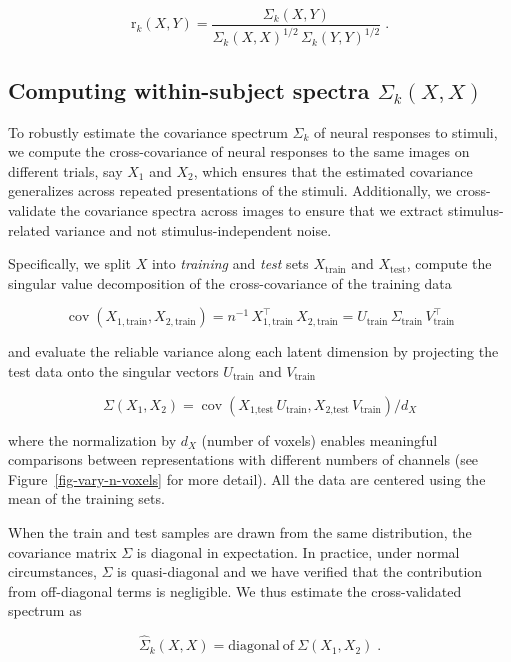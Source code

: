 \documentclass[10pt]{article}
\begin{document}
\[
\mathrm{r}_k(X, Y) =  \frac{\Sigma_k(X, Y)}{\Sigma_k(X, X)^{1/2}\, \Sigma_k(Y, Y)^{1/2}}\;.
\]

\subsection{\texorpdfstring{Computing within-subject spectra
\(\Sigma_k(X, X)\)}{Computing within-subject spectra \textbackslash Sigma\_k(X, X)}}\label{computing-within-subject-spectra-sigma_kx-x}

To robustly estimate the covariance spectrum \(\Sigma_k\) of neural
responses to stimuli, we compute the cross-covariance of neural
responses to the same images on different trials, say \(X_1\) and
\(X_2\), which ensures that the estimated covariance generalizes across
repeated presentations of the stimuli. Additionally, we cross-validate
the covariance spectra across images to ensure that we extract
stimulus-related variance and not stimulus-independent noise.

Specifically, we split \(X\) into \emph{training} and \emph{test} sets
\(X_\text{train}\) and \(X_\text{test}\), compute the singular value
decomposition of the cross-covariance of the training data

\[
\operatorname{cov}
\left(X_{1,\text{train}} , X_{2,\text{train}}\right)
= n^{-1}\,X_{1,\text{train}}^\top\,X_{2,\text{train}}
= U_\text{train}\, \Sigma_\text{train}\, V_\text{train}^\top
\]

and evaluate the reliable variance along each latent dimension by
projecting the test data onto the singular vectors \(U_\text{train}\)
and \(V_\text{train}\)

\[
\Sigma(X_1, X_2) = \operatorname{cov}
\left(X_{\text{1,test}}\,U_\text{train}, X_{\text{2,test}}\,V_\text{train} \right) / d_X
\]

where the normalization by \(d_X\) (number of voxels) enables meaningful
comparisons between representations with different numbers of channels
(see Figure~\ref{fig-vary-n-voxels} for more detail). All the data are
centered using the mean of the training sets.

When the train and test samples are drawn from the same distribution,
the covariance matrix \(\Sigma\) is diagonal in expectation. In
practice, under normal circumstances, \(\Sigma\) is quasi-diagonal and
we have verified that the contribution from off-diagonal terms is
negligible. We thus estimate the cross-validated spectrum as

\[
\hat{\Sigma}_k(X, X) = \mathrm{diagonal~of~}\Sigma(X_1, X_2)\;.
\]
\end{document}
